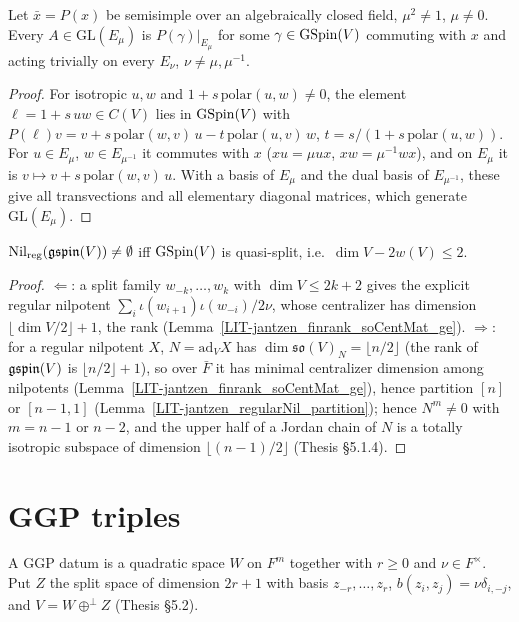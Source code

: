 \begin{lemma}
\label{steinberg_rank_one}
\leanok
{}
Let $\bar x=P(x)$ be semisimple over an algebraically closed field, $\mu^2\neq1$, $\mu\neq0$. Every $A\in\mathrm{GL}(E_\mu)$ is
$P(\gamma)|_{E_\mu}$ for some $\gamma\in\mathrm{GSpin}(V)$ commuting with $x$ and acting trivially on every $E_\nu$, $\nu\neq\mu,\mu^{-1}$.
\end{lemma}
\begin{proof}
\leanok
For isotropic $u,w$ and $1+s\,\mathrm{polar}(u,w)\neq0$, the element $\ell=1+s\,uw\in C(V)$ lies in $\mathrm{GSpin}(V)$ with
$P(\ell)v=v+s\,\mathrm{polar}(w,v)\,u-t\,\mathrm{polar}(u,v)\,w$, $t=s/(1+s\,\mathrm{polar}(u,w))$. For $u\in E_\mu$, $w\in E_{\mu^{-1}}$
it commutes with $x$ ($xu=\mu ux$, $xw=\mu^{-1}wx$), and on $E_\mu$ it is $v\mapsto v+s\,\mathrm{polar}(w,v)\,u$. With a basis of $E_\mu$
and the dual basis of $E_{\mu^{-1}}$, these give all transvections and all elementary diagonal matrices, which generate
$\mathrm{GL}(E_\mu)$.
\end{proof}

\begin{theorem}
\label{nilReg_nonempty_iff_quasiSplit}
\leanok
{}
$\mathrm{Nil}_{\mathrm{reg}}(\mathfrak{gspin}(V))\neq\emptyset$ iff $\mathrm{GSpin}(V)$ is quasi-split, i.e.\ $\dim V-2w(V)\le 2$.
\end{theorem}
\begin{proof}
\leanok
{}
$\Leftarrow$: a split family $w_{-k},\dots,w_k$ with $\dim V\le 2k+2$ gives the explicit regular nilpotent
$\sum_i\iota(w_{i+1})\iota(w_{-i})/2\nu$, whose centralizer has dimension $\lfloor\dim V/2\rfloor+1$, the rank (Lemma~\ref{LIT-jantzen_finrank_soCentMat_ge}).
$\Rightarrow$: for a regular nilpotent $X$, $N=\mathrm{ad}_V X$ has $\dim\mathfrak{so}(V)_N=\lfloor n/2\rfloor$ (the rank of $\mathfrak{gspin}(V)$ is
$\lfloor n/2\rfloor+1$), so over $\bar F$ it has minimal centralizer dimension among nilpotents (Lemma~\ref{LIT-jantzen_finrank_soCentMat_ge}), hence
partition $[n]$ or $[n-1,1]$ (Lemma~\ref{LIT-jantzen_regularNil_partition}); hence
$N^{m}\neq0$ with $m=n-1$ or $n-2$, and the upper half of a Jordan chain of $N$ is a totally isotropic subspace of dimension
$\lfloor(n-1)/2\rfloor$ (Thesis \S5.1.4).
\end{proof}

\section{GGP triples}
\begin{definition}
\label{GGPData}
\leanok
A GGP datum is a quadratic space $W$ on $F^m$ together with $r\ge 0$ and $\nu\in F^\times$. Put
$Z$ the split space of dimension $2r+1$ with basis $z_{-r},\dots,z_r$, $b(z_i,z_j)=\nu\delta_{i,-j}$,
and $V = W\oplus^\perp Z$ (Thesis \S5.2).
\end{definition}

